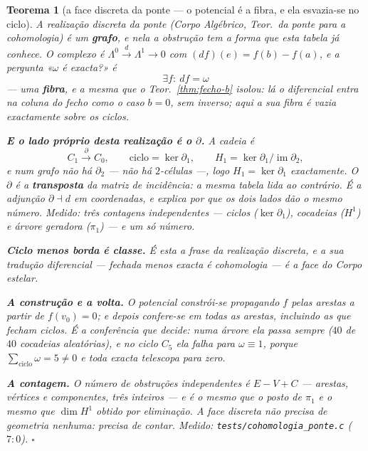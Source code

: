 \documentclass[11pt,a4paper]{article}
\newtheorem{teorema}{Teorema}
\newcommand{\code}[1]{\texttt{#1}}
\begin{document}
\begin{teorema}[a face discreta da ponte --- o potencial é a fibra, e ela
esvazia-se no ciclo]\label{thm:ponte-discreta}
A realização discreta da ponte
(\emph{Corpo Algébrico}, Teor.~da ponte para a cohomologia) é um
\textbf{grafo}, e nela a obstrução tem a forma que esta tabela já
conhece. O complexo é
$\Lambda^{0}\xrightarrow{d}\Lambda^{1}\to0$ com
$(df)(e)=f(b)-f(a)$, e a pergunta «$\omega$ é exacta?» é
\[
\boxed{\;\exists f:\ df=\omega\;}
\]
--- uma \textbf{fibra}, e a mesma que o Teor.~\ref{thm:fecho-b} isolou:
lá o diferencial entra na coluna do fecho como o caso $b=0$, sem
inverso; aqui a sua fibra é vazia exactamente sobre os ciclos.

\textbf{E o lado próprio desta realização é o $\partial$.} A cadeia é
\[
C_{1}\xrightarrow{\;\partial\;}C_{0},
\qquad
\text{ciclo}=\ker\partial_{1},
\qquad
H_{1}=\ker\partial_{1}/\operatorname{im}\partial_{2},
\]
e num grafo \emph{não há} $\partial_{2}$ --- não há $2$-células ---,
logo $H_{1}=\ker\partial_{1}$ exactamente. O $\partial$ é a
\textbf{transposta} da matriz de incidência: a mesma tabela lida ao
contrário. É a adjunção $\partial\dashv d$ em coordenadas, e explica
por que os dois lados dão o mesmo número. Medido: três contagens
independentes --- ciclos ($\ker\partial_1$), cocadeias ($H^1$) e árvore
geradora ($\pi_1$) --- e um só número.

\textbf{Ciclo menos borda é classe.} É esta a frase da realização
discreta, e a sua tradução diferencial --- \emph{fechada menos exacta é
cohomologia} --- é a face do \emph{Corpo estelar}.

\textbf{A construção e a volta.} O potencial constrói-se propagando
$f$ pelas arestas a partir de $f(v_{0})=0$; e depois \emph{confere-se
em todas as arestas}, incluindo as que fecham ciclos. É a conferência
que decide: numa árvore ela passa sempre ($40$ de $40$ cocadeias
aleatórias), e no ciclo $C_{5}$ ela falha para $\omega\equiv1$, porque
$\sum_{\text{ciclo}}\omega=5\neq0$ e toda exacta telescopa para zero.

\textbf{A contagem.} O número de obstruções independentes é
$E-V+C$ --- arestas, vértices e componentes, três inteiros --- e é
\emph{o mesmo} que o posto de $\pi_{1}$ e o mesmo que $\dim H^{1}$
obtido por eliminação. \emph{A face discreta não precisa de geometria
nenhuma: precisa de contar.}
\emph{Medido:} \code{tests/cohomologia\_ponte.c} ($7{:}0$).
$\square$
\end{teorema}
\end{document}
